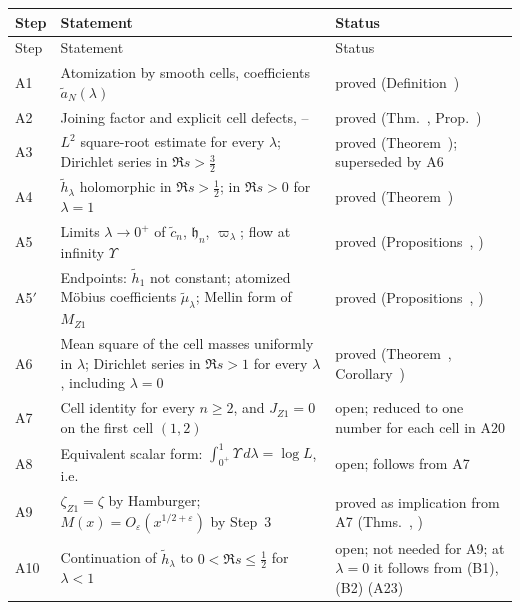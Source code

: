 \documentclass[11pt,reqno]{amsart}
\makeatletter
\let\CG@origref\ref
\let\CG@origeqref\eqref
\newcommand{\CG@gettip}[1]{\@ifundefined{CGTip@#1}{Reference: #1}{\csname CGTip@#1\endcsname}}
\DeclareRobustCommand{\CGref}[1]{\pdftooltip{\CG@origref{#1}}{\CG@gettip{#1}}}
\DeclareRobustCommand{\CGeqref}[1]{\pdftooltip{\CG@origeqref{#1}}{\CG@gettip{#1}}}
\numberwithin{equation}{section}
\theoremstyle{plain}
\theoremstyle{definition}
\theoremstyle{remark}
\newcommand{\eps}{\varepsilon}
\makeatother
\begin{document}
\begingroup\small
\begin{longtable}{p{}p{}p{}}
\toprule
Step & Statement & Status\\
\midrule
\endfirsthead
\toprule
Step & Statement & Status\\
\midrule
\endhead
\bottomrule
\endfoot
A1 & Atomization by smooth cells, coefficients $\tilde a_N(\lambda)$ & proved (Definition~\CGref{def:atomized})\\
A2 & Joining factor and explicit cell defects, \CGeqref{eq:joining-factor}--\CGeqref{eq:cell-explicit-derivative} & proved (Thm.~\CGref{thm:joining-factor}, Prop.~\CGref{prop:cell-explicit})\\
A3 & $L^2$ square-root estimate for every $\lambda$; Dirichlet series in $\Re s>\frac32$ & proved (Theorem~\CGref{thm:atomized-continuation}); superseded by A6\\
A4 & $\tilde h_\lambda$ holomorphic in $\Re s>\frac12$; in $\Re s>0$ for $\lambda=1$ & proved (Theorem~\CGref{thm:atomized-continuation})\\
A5 & Limits $\lambda\to0^+$ of $\tilde c_n$, $\mathfrak h_n$, $\varpi_\lambda$; flow at infinity $\Upsilon$ & proved (Propositions~\CGref{prop:family-flow}, \CGref{prop:cell-limit})\\
A5$'$ & Endpoints: $\tilde h_1$ not constant; atomized M\"obius coefficients $\tilde\mu_\lambda$; Mellin form of $M_{Z1}$ & proved (Propositions~\CGref{prop:atomized-clock}, \CGref{prop:Mellin-Mertens})\\
A6 & Mean square of the cell masses uniformly in $\lambda$; Dirichlet series in $\Re s>1$ for every $\lambda$, including $\lambda=0$ & proved (Theorem~\CGref{thm:mean-square-cells}, Corollary~\CGref{cor:abscissa-one})\\
A7 & Cell identity \CGeqref{eq:closing-cells} for every $n\ge2$, and $J_{Z1}=0$ on the first cell $(1,2)$ & open; reduced to one number for each cell in A20\\
A8 & Equivalent scalar form: $\int_{0^+}^1\Upsilon\,d\lambda=\log L$, i.e.\ \CGeqref{eq:product-identity} & open; follows from A7\\
A9 & $\zeta_{Z1}=\zeta$ by Hamburger; $M(x)=O_\eps(x^{1/2+\eps})$ by Step~3 & proved as implication from A7 (Thms.~\CGref{thm:closing}, \CGref{thm:step3})\\
A10 & Continuation of $\tilde h_\lambda$ to $0<\Re s\le\frac12$ for $\lambda<1$ & open; not needed for A9; at $\lambda=0$ it follows from \textup{(B1)}, \textup{(B2)} (A23)\\

\end{longtable}
\end{document}
